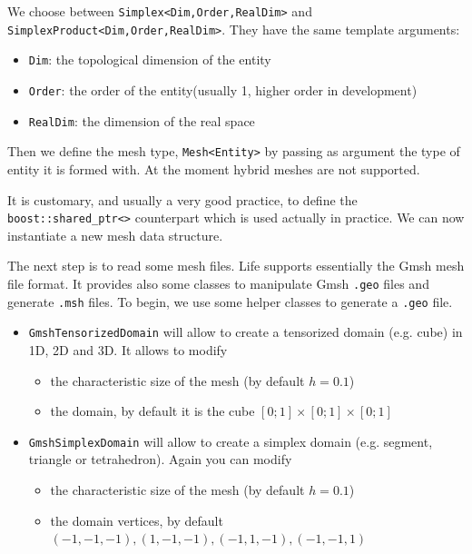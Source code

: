 \documentclass[a4paper]{book}
\newcommand{\life}{Life\xspace}
\begin{document}
We choose between \lstinline!Simplex<Dim,Order,RealDim>!  and
\lstinline!SimplexProduct<Dim,Order,RealDim>!. They have the same
template arguments:
\begin{itemize}
\item \lstinline!Dim!: the topological dimension of the entity
\item \lstinline!Order!: the order of the entity(usually 1, higher order in development)
\item \lstinline!RealDim!: the dimension of the real space
\end{itemize}




Then we define the mesh type, \lstinline!Mesh<Entity>! by passing as
argument the type of entity it is formed with. At the moment hybrid
meshes are not supported.



It is customary, and usually a very good practice, to define the
\lstinline!boost::shared_ptr<>!  counterpart which is used actually in
practice. We can now instantiate a new mesh data structure.



The next step is to read some mesh files. \life supports essentially
the Gmsh mesh file format. It provides also some classes to manipulate
Gmsh \lstinline!.geo! files and generate \lstinline!.msh! files. To
begin, we use some helper classes to generate a \lstinline!.geo! file.

\begin{itemize}
\item \lstinline!GmshTensorizedDomain! will allow to create a
  tensorized domain (e.g. cube) in 1D, 2D and 3D. It allows to modify
  \begin{itemize}
  \item the characteristic size of the mesh (by default $h=0.1$)
  \item the domain, by default it is the cube $[0;1]\times[0;1]\times[0;1]$
  \end{itemize}
\item \lstinline!GmshSimplexDomain! will allow to create a simplex
  domain (e.g. segment, triangle or tetrahedron). Again you can modify
  \begin{itemize}
  \item the characteristic size of the mesh (by default $h=0.1$)
  \item the domain vertices, by default $(-1,-1,-1), (1,-1,-1), (-1,1,-1), (-1,-1,1)$
  \end{itemize}
\end{itemize}
\end{document}
